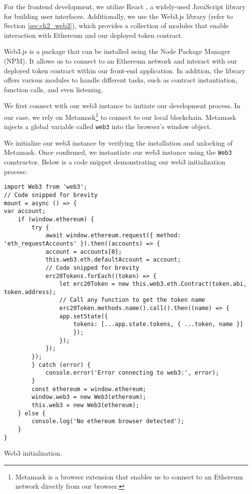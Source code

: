 For the frontend development, we utilize React \cite{react}, a widely-used JavaScript library for building user interfaces. Additionally, we use the Web3.js \cite{eth_web3js} library (refer to Section \ref{sec:ch2_web3}), which provides a collection of modules that enable interaction with Ethereum and our deployed token contract.

Web3.js is a package that can be installed using the Node Package Manager (NPM). It allows us to connect to an Ethereum network and interact with our deployed token contract within our front-end application. In addition, the library offers various modules to handle different tasks, such as contract instantiation, function calls, 
and even listening.

We first connect with our web3 instance to initiate our development process. In our case, we rely on Metamask\footnote{Metamask is a browser extension that enables us to connect to an Ethereum network directly from our browser.} to connect to our local blockchain. Metamask injects a global variable called \texttt{web3} into the browser's window object.

We initialize our web3 instance by verifying the installation and unlocking of Metamask. Once confirmed, we instantiate our web3 instance using the \texttt{Web3} constructor. Below is a code snippet demonstrating our web3 initialization process:

\begin{listing}[H]
    \begin{verbatim}
import Web3 from 'web3';
// Code snipped for brevity
mount = async () => {
var account;
    if (window.ethereum) {
        try {
            await window.ethereum.request({ method: 'eth_requestAccounts' }).then((accounts) => {
            account = accounts[0];
            this.web3.eth.defaultAccount = account;
            // Code snipped for brevity
            erc20Tokens.forEach((token) => {
                let erc20Token = new this.web3.eth.Contract(token.abi, token.address);
                // Call any function to get the token name
                erc20Token.methods.name().call().then((name) => {
                app.setState({
                    tokens: [...app.state.tokens, { ...token, name }]
                    });
                });
            });
        });
        } catch (error) {
            console.error('Error connecting to web3:', error);
        }
        const ethereum = window.ethereum;
        window.web3 = new Web3(ethereum);
        this.web3 = new Web3(ethereum);
    } else {
        console.log('No ethereum browser detected');
    }
}
    \end{verbatim}
    \caption{Web3 initialization.}
    \label{lst:web3_init}
\end{listing}

